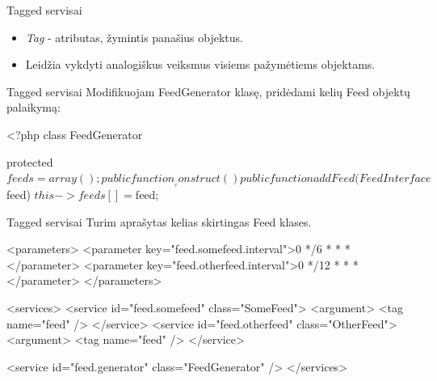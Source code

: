 \documentclass[12pt,a4paper]{beamer}
\begin{document}
\begin{frame}[fragile]{Tagged servisai}
    \begin{itemize}
        \item \emph{Tag} - atributas, žymintis panašius objektus.
        \item Leidžia vykdyti analogiškus veiksmus visiems pažymėtiems objektams.
    \end{itemize}
\end{frame}

\begin{frame}[fragile]{Tagged servisai}
    Modifikuojam FeedGenerator klasę, pridėdami kelių Feed objektų palaikymą:
    \vskip0.5cm
\begin{phpcode}
    <?php
    class FeedGenerator {

        protected $feeds = array();

        public function __construct() {
        }

        public function addFeed(FeedInterface $feed) {
            $this->feeds[] = $feed;
        }
    }
\end{phpcode}
\end{frame}


\begin{frame}[fragile]{Tagged servisai}
    Turim aprašytas kelias skirtingas Feed klases.
    \vskip0.5cm
\begin{xmlcode}
    <parameters>
        <parameter key="feed.somefeed.interval">0 */6 * * *</parameter>
        <parameter key="feed.otherfeed.interval">0 */12 * * *</parameter>
    </parameters>

    <services>
        <service id="feed.somefeed" class="SomeFeed">
            <argument>%
            <tag name="feed" />
        </service>
        <service id="feed.otherfeed" class="OtherFeed">
            <argument>%
            <tag name="feed" />
        </service>

        <service id="feed.generator" class="FeedGenerator" />
    </services>
\end{xmlcode}
\end{frame}
\end{document}

